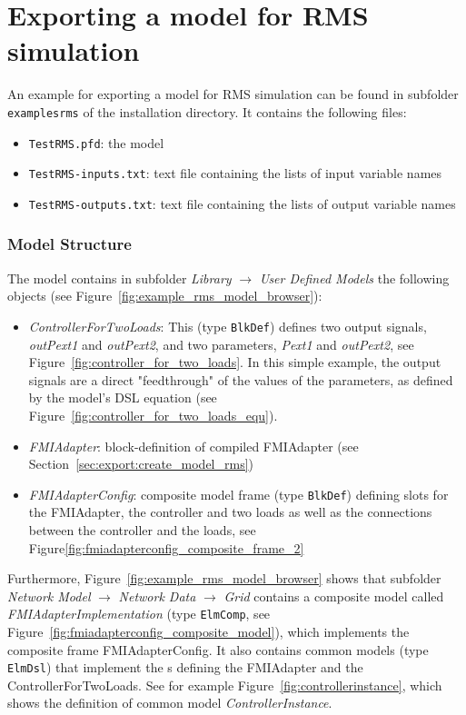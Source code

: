 \newpage


\section{Exporting a model for RMS simulation}
\label{sec:examples:rmssim}

An example for exporting a model for RMS simulation can be found in subfolder \texttt{examplesrms} of the installation directory.
It contains the following files:
\begin{itemize}
  \item \texttt{TestRMS.pfd}: the \pf model
  \item \texttt{TestRMS-inputs.txt}: text file containing the lists of input variable names
  \item \texttt{TestRMS-outputs.txt}: text file containing the lists of output variable names
\end{itemize}

\subsubsection*{Model Structure}

The \pf model contains in subfolder \emph{Library} $\to$ \emph{User Defined Models} the following objects (see Figure~\ref{fig:example_rms_model_browser}):
\begin{itemize}
  \item \emph{ControllerForTwoLoads}: This \dslmodel (type \texttt{BlkDef}) defines two output signals, \emph{outPext1} and \emph{outPext2}, and two parameters, \emph{Pext1} and \emph{outPext2}, see Figure~\ref{fig:controller_for_two_loads}.
  In this simple example, the output signals are a direct "feedthrough" of the values of the parameters, as defined by the model's DSL equation (see Figure~\ref{fig:controller_for_two_loads_equ}).
  \item \emph{FMIAdapter}: block-definition of compiled \dslmodel FMIAdapter (see Section~\ref{sec:export:create_model_rms})
  \item \emph{FMIAdapterConfig}: composite model frame (type \texttt{BlkDef}) defining slots for the FMIAdapter, the controller and two loads as well as the connections between the controller and the loads, see Figure\ref{fig:fmiadapterconfig_composite_frame_2}
\end{itemize}

Furthermore, Figure~\ref{fig:example_rms_model_browser} shows that subfolder \emph{Network Model} $\to$ \emph{Network Data} $\to$ \emph{Grid} contains a composite model called \emph{FMIAdapterImplementation} (type \texttt{ElmComp}, see Figure~\ref{fig:fmiadapterconfig_composite_model}), which implements the composite frame FMIAdapterConfig.
It also contains common models (type \texttt{ElmDsl}) that implement the {\dslmodel}s defining the FMIAdapter and the ControllerForTwoLoads.
See for example Figure~\ref{fig:controllerinstance}, which shows the definition of common model \emph{ControllerInstance}.


